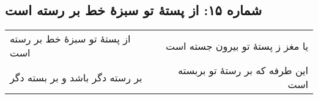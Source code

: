 \begin{center}
\section*{شماره ۱۵: از پستۀ تو سبزۀ خط بر رسته است}
\label{sec:015}
\begin{longtable}{l p{0.5cm} r}
از پستهٔ تو سبزهٔ خط بر رسته است
&&
یا مغز ز پستهٔ تو بیرون جسته است
\\
بر رسته دگر باشد و بر بسته دگر
&&
این طرفه که بر رستهٔ تو بربسته است
\\
\end{longtable}
\end{center}
